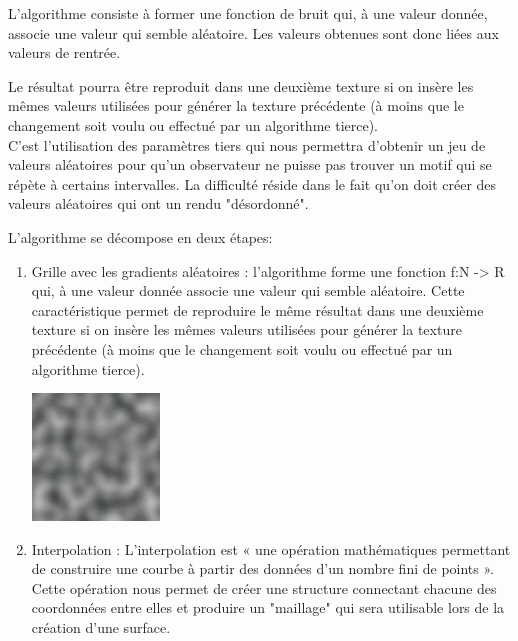 L'algorithme consiste à former une fonction de bruit qui, à une valeur donnée, associe une valeur qui semble aléatoire. Les valeurs obtenues sont donc liées aux valeurs de rentrée. 

Le résultat pourra être reproduit dans une deuxième texture si on insère les mêmes valeurs utilisées pour générer la texture précédente (à moins que le changement soit voulu ou effectué par un algorithme tierce).\\

C'est l'utilisation des paramètres tiers qui nous permettra d'obtenir un jeu de valeurs aléatoires pour qu'un observateur ne puisse pas trouver un motif qui se répète à certains intervalles. La difficulté réside dans le fait qu'on doit créer des valeurs aléatoires qui ont un rendu "désordonné". 

L'algorithme se décompose en deux étapes:
\begin{enumerate}
	\item Grille avec les gradients aléatoires : 
		l'algorithme forme une fonction f:N -> R qui, à une valeur donnée associe une valeur qui semble aléatoire. Cette caractéristique permet de reproduire le même résultat dans une deuxième texture si on insère les mêmes valeurs utilisées pour générer la texture précédente (à moins que le changement soit voulu ou effectué par un algorithme tierce).\\

\begin{center}
    \centering
    \includegraphics[height = 3 cm]{images/Perlin_noise.jpg}
\end{center}

	\item Interpolation : 
	L'interpolation est « une opération mathématiques permettant de construire une courbe à partir des données d'un nombre fini de points ». Cette opération nous permet de créer une structure connectant chacune des coordonnées entre elles et produire un "maillage" qui sera utilisable lors de la création d'une surface.

\end{enumerate}

